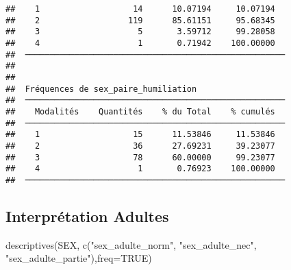 \documentclass[
]{article}
\newenvironment{Shaded}{\begin{snugshade}}{\end{snugshade}}
\newcommand{\AttributeTok}[1]{\textcolor[rgb]{0.77,0.63,0.00}{#1}}
\newcommand{\ConstantTok}[1]{\textcolor[rgb]{0.00,0.00,0.00}{#1}}
\newcommand{\FunctionTok}[1]{\textcolor[rgb]{0.00,0.00,0.00}{#1}}
\newcommand{\NormalTok}[1]{#1}
\newcommand{\StringTok}[1]{\textcolor[rgb]{0.31,0.60,0.02}{#1}}
\begin{document}
\begin{verbatim}
##    1                   14      10.07194     10.07194   
##    2                  119      85.61151     95.68345   
##    3                    5       3.59712     99.28058   
##    4                    1       0.71942    100.00000   
##  ───────────────────────────────────────────────────── 
## 
## 
##  Fréquences de sex_paire_humiliation                   
##  ───────────────────────────────────────────────────── 
##    Modalités    Quantités    % du Total    % cumulés   
##  ───────────────────────────────────────────────────── 
##    1                   15      11.53846     11.53846   
##    2                   36      27.69231     39.23077   
##    3                   78      60.00000     99.23077   
##    4                    1       0.76923    100.00000   
##  ─────────────────────────────────────────────────────
\end{verbatim}

\hypertarget{interpruxe9tation-adultes}{%
\subsection{Interprétation Adultes}\label{interpruxe9tation-adultes}}

\begin{Shaded}
\begin{Highlighting}[]
\FunctionTok{descriptives}\NormalTok{(SEX, }\FunctionTok{c}\NormalTok{(}\StringTok{"sex\_adulte\_norm"}\NormalTok{, }\StringTok{"sex\_adulte\_nec"}\NormalTok{, }\StringTok{"sex\_adulte\_partie"}\NormalTok{),}\AttributeTok{freq=}\ConstantTok{TRUE}\NormalTok{)}
\end{Highlighting}
\end{Shaded}
\end{document}
